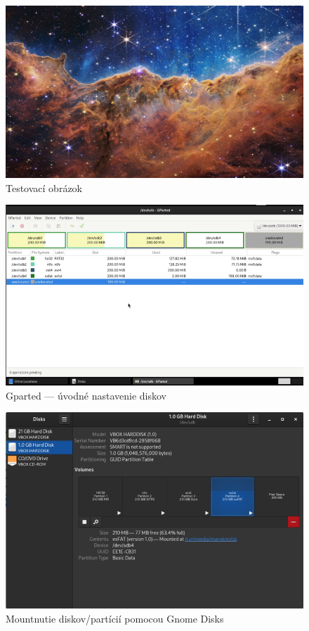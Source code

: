 \documentclass[12pt,oneside,slovak,a4paper]{article}
\begin{document}
\begin{figure}[H]
	\centering
	\captionsetup{justification=centering,margin=2cm}
	\includegraphics[width=\linewidth]{./images/testdisk_testing/NASA-JWST.png}
	\centering
	\caption{Testovací obrázok}
\end{figure}

\begin{figure}[H]
	\centering
	\captionsetup{justification=centering,margin=2cm}
	\includegraphics[scale=0.8]{./images/testdisk_testing/gparted-setup.png}
	\centering
	\caption{Gparted --- úvodné nastavenie diskov}
\end{figure}

\begin{figure}[H]
	\centering
	\captionsetup{justification=centering,margin=2cm}
	\includegraphics[scale=0.8]{./images/testdisk_testing/disk-mount-gnome-disks.png}
	\centering
	\caption{Mountnutie diskov/partícií pomocou Gnome Disks}
\end{figure}
\end{document}

